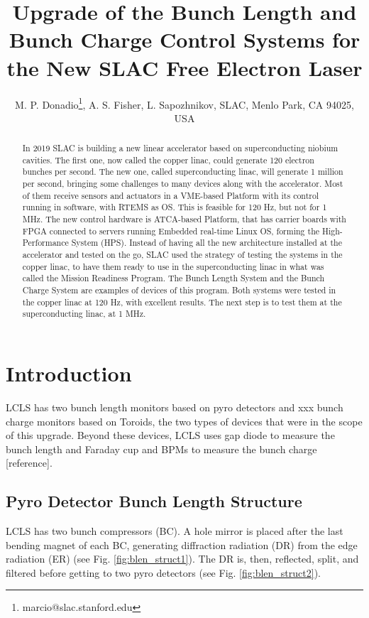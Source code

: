 \documentclass[letter,
               biblatex,     %
               keeplastbox,   %
               ]{jacow}
\begin{document}
\title{Upgrade of the Bunch Length and Bunch Charge Control Systems for the New SLAC Free Electron Laser}

\author{M. P. Donadio\thanks{marcio@slac.stanford.edu}, A. S. Fisher, L. Sapozhnikov, SLAC, Menlo Park, CA 94025, USA}
	
\maketitle


\begin{abstract}
In 2019 SLAC is building a new linear accelerator based on superconducting niobium cavities. The first one, now called the copper linac, could generate 120 electron bunches per second. The new one, called superconducting linac, will generate 1 million per second, bringing some challenges to many devices along with the accelerator. Most of them receive sensors and actuators in a VME-based Platform with its control running in software, with RTEMS as OS. This is feasible for 120 Hz, but not for 1 MHz. The new control hardware is ATCA-based Platform, that has carrier boards with FPGA connected to servers running Embedded real-time Linux OS, forming the High-Performance System (HPS). Instead of having all the new architecture installed at the accelerator and tested on the go, SLAC used the strategy of testing the systems in the copper linac, to have them ready to use in the superconducting linac in what was called the Mission Readiness Program. The Bunch Length System and the Bunch Charge System are examples of devices of this program. Both systems were tested in the copper linac at 120 Hz, with excellent results. The next step is to test them at the superconducting linac, at 1 MHz.
\end{abstract}


\section{Introduction}
LCLS has two bunch length monitors based on pyro detectors\cite{blen-pac07} and xxx bunch charge monitors based on Toroids, the two types of devices that were in the scope of this upgrade. Beyond these devices, LCLS uses gap diode to measure the bunch length\cite{injector-commissioning-2007} and Faraday cup and BPMs to measure the bunch charge [reference].

\subsection{Pyro Detector Bunch Length Structure}
LCLS has two bunch compressors (BC). A hole mirror is placed after the last bending magnet of each BC, generating diffraction radiation (DR) from the edge radiation (ER) (see Fig. \ref{fig:blen_struct1}). The DR is, then, reflected, split, and filtered before getting to two pyro detectors (see Fig. \ref{fig:blen_struct2}). \cite{blen-pac07}
\end{document}
